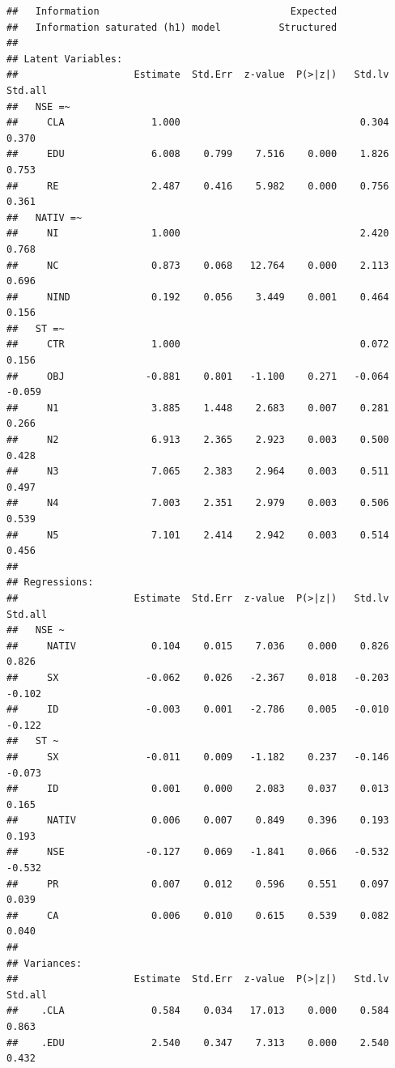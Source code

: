 \documentclass[
  12pt,
]{article}
\begin{document}
\begin{verbatim}
##   Information                                 Expected
##   Information saturated (h1) model          Structured
## 
## Latent Variables:
##                    Estimate  Std.Err  z-value  P(>|z|)   Std.lv  Std.all
##   NSE =~                                                                
##     CLA               1.000                               0.304    0.370
##     EDU               6.008    0.799    7.516    0.000    1.826    0.753
##     RE                2.487    0.416    5.982    0.000    0.756    0.361
##   NATIV =~                                                              
##     NI                1.000                               2.420    0.768
##     NC                0.873    0.068   12.764    0.000    2.113    0.696
##     NIND              0.192    0.056    3.449    0.001    0.464    0.156
##   ST =~                                                                 
##     CTR               1.000                               0.072    0.156
##     OBJ              -0.881    0.801   -1.100    0.271   -0.064   -0.059
##     N1                3.885    1.448    2.683    0.007    0.281    0.266
##     N2                6.913    2.365    2.923    0.003    0.500    0.428
##     N3                7.065    2.383    2.964    0.003    0.511    0.497
##     N4                7.003    2.351    2.979    0.003    0.506    0.539
##     N5                7.101    2.414    2.942    0.003    0.514    0.456
## 
## Regressions:
##                    Estimate  Std.Err  z-value  P(>|z|)   Std.lv  Std.all
##   NSE ~                                                                 
##     NATIV             0.104    0.015    7.036    0.000    0.826    0.826
##     SX               -0.062    0.026   -2.367    0.018   -0.203   -0.102
##     ID               -0.003    0.001   -2.786    0.005   -0.010   -0.122
##   ST ~                                                                  
##     SX               -0.011    0.009   -1.182    0.237   -0.146   -0.073
##     ID                0.001    0.000    2.083    0.037    0.013    0.165
##     NATIV             0.006    0.007    0.849    0.396    0.193    0.193
##     NSE              -0.127    0.069   -1.841    0.066   -0.532   -0.532
##     PR                0.007    0.012    0.596    0.551    0.097    0.039
##     CA                0.006    0.010    0.615    0.539    0.082    0.040
## 
## Variances:
##                    Estimate  Std.Err  z-value  P(>|z|)   Std.lv  Std.all
##    .CLA               0.584    0.034   17.013    0.000    0.584    0.863
##    .EDU               2.540    0.347    7.313    0.000    2.540    0.432

\end{verbatim}
\end{document}

